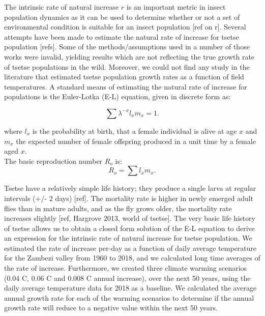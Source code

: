 \documentclass[10pt,a4paper]{article}
\begin{document}
The intrinsic rate of natural increase $r$ is an important metric in insect population dynamics as it can be used to determine whether or not a set of environmental condition is suitable for an insect population [ref on r]. Several attempts have been made to estimate the natural rate of increase for tsetse population [refs]. Some of the methods/assumptions used in a number of those works were invalid, yielding results which are not reflecting the true growth rate of tsetse populations in the wild. Moreover, we could not find any study in the literature that estimated tsetse population growth rates as a function of field temperatures. 
A standard means of estimating the natural rate of increase for populations is the Euler-Lotka (E-L) equation, given in discrete form as:

\begin{equation}
\label{equation3}
\sum \lambda^{-x}l_{x}m_{x} = 1.
\end{equation}

where  $l_{x}$ is the probability at birth, that a female individual is alive at age $x$ and $m_{x}$ the expected number of female offspring produced in a unit time by a female aged $x$.  \\ 

The basic reproduction number $R_{o}$ is:
\begin{equation}
\label{equation4}
R_{o}= \sum l_{x}m_{x}. 
\end{equation}

Tsetse have a relatively simple life history; they produce a single larva at regular intervals (+/- 2 days) [ref]. The mortality rate is higher in newly emerged adult flies than in mature adults, and as the fly grows older, the mortality rate increases slightly [ref, Hargrove 2013, world of tsetse].   The very basic life history of tsetse allows us to obtain a closed form solution of the E-L equation to derive an expression for the intrinsic rate of natural increase for tsetse population. We estimated the rate of increase per-day as a function of daily average temperature for the Zambezi valley from 1960 to 2018, and we calculated long time averages of the  rate of increase. Furthermore, we created three climate warming scenarios (0.04 \degree C, 0.06 \degree C and 0.008 \degree C annual increase), over the next 50 years,  using the daily average temperature data for 2018 as a baseline. We calculated the average annual growth rate for each of the warming scenarios to determine if the annual growth rate will reduce to a negative value within the next 50 years.     
\end{document}
